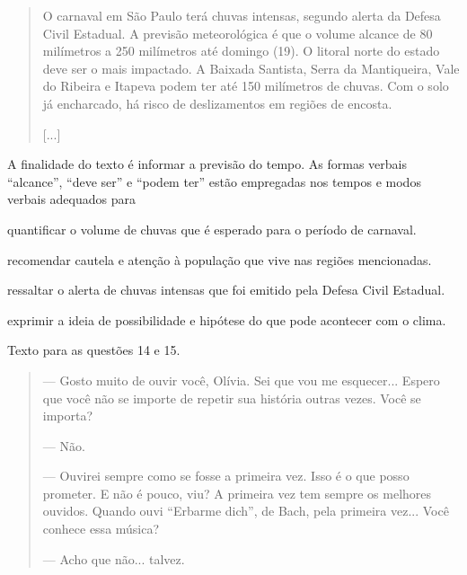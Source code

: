 \begin{quote}
O carnaval em São Paulo terá chuvas intensas, segundo alerta da Defesa
Civil Estadual. A previsão meteorológica é que o volume alcance de 80
milímetros a 250 milímetros até domingo (19). O litoral norte do estado
deve ser o mais impactado. A Baixada Santista, Serra da Mantiqueira,
Vale do Ribeira e Itapeva podem ter até 150 milímetros de chuvas. Com o
solo já encharcado, há risco de deslizamentos em regiões de encosta.

{[}...{]}

\end{quote}

A finalidade do texto é informar a previsão do tempo. As formas verbais ``alcance'', ``deve ser'' e ``podem ter'' estão empregadas nos tempos e modos verbais adequados para

\begin{escolha}
\item quantificar o volume de chuvas que é esperado para o período de carnaval.

\item recomendar cautela e atenção à população que vive nas regiões mencionadas.

\item ressaltar o alerta de chuvas intensas que foi emitido pela Defesa
Civil Estadual.

\item exprimir a ideia de possibilidade e hipótese do que pode acontecer
com o clima.
\end{escolha}

Texto para as questões 14 e 15.

\begin{quote}
--- Gosto muito de ouvir você, Olívia. Sei que vou me esquecer... Espero
que você não se importe de repetir sua história outras vezes. Você se
importa?

--- Não.

--- Ouvirei sempre como se fosse a primeira vez. Isso é o que posso
prometer. E não é pouco, viu? A primeira vez tem sempre os melhores
ouvidos. Quando ouvi ``Erbarme dich'', de Bach, pela primeira vez...
Você conhece essa música?

--- Acho que não... talvez.

\end{quote}

